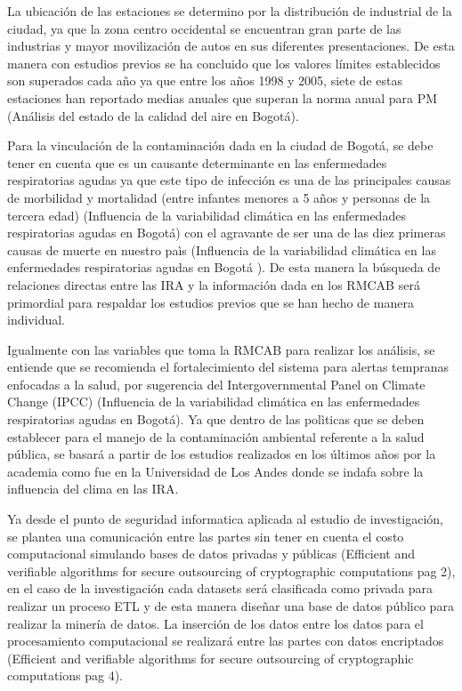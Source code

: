 \documentclass[a4paper, 11pt, oneside]{article}
\theoremstyle{definition}
\theoremstyle{remark}
\begin{document}
La ubicación de las estaciones se determino por la distribución de industrial de la ciudad, ya que la zona centro occidental se encuentran gran parte de las industrias y mayor movilización de autos en sus diferentes presentaciones. De esta manera con estudios previos se ha concluido que los valores límites establecidos son superados cada año ya que entre los años 1998 y 2005, siete de estas estaciones han reportado medias anuales que superan la norma anual para PM (Análisis del estado de la calidad del aire en Bogotá).

Para la vinculación de la contaminación dada en la ciudad de Bogotá, se debe tener en cuenta que es un causante determinante en las enfermedades respiratorias agudas ya que este tipo de infección es una de las principales causas de morbilidad y mortalidad (entre infantes menores a 5 años y personas de la tercera edad) (Influencia de la variabilidad climática en las enfermedades respiratorias agudas en Bogotá) con el agravante de ser una de las diez primeras causas de muerte en nuestro paìs (Influencia de la variabilidad climática en las enfermedades respiratorias agudas en Bogotá 
). De esta manera la búsqueda de relaciones directas entre las IRA y la información dada en los RMCAB será primordial para respaldar los estudios previos que se han hecho de manera individual. 


Igualmente con las variables que toma la RMCAB para realizar los análisis, se entiende que se recomienda el fortalecimiento del sistema para alertas tempranas enfocadas a la salud, por sugerencia del Intergovernmental Panel on Climate Change (IPCC) (Influencia de la variabilidad climática en las enfermedades respiratorias agudas en Bogotá). Ya que dentro de las polìticas que se deben establecer para el manejo de la contaminación ambiental referente a la salud pública, se basará a partir de los estudios realizados en los últimos años por la academia como fue en la Universidad de Los Andes donde se indafa sobre la influencia del clima en las IRA.

Ya desde el punto de seguridad informatica aplicada al estudio de investigación, se plantea una comunicación entre las partes sin tener en cuenta el costo computacional simulando bases de datos privadas y públicas (Efficient and verifiable algorithms for secure outsourcing of cryptographic computations pag 2), en el caso de la investigación cada datasets será clasificada como privada para realizar un proceso ETL y de esta manera diseñar una base de datos público para realizar la minería de datos. La inserción de los datos entre los datos para el procesamiento computacional se realizará entre las partes con datos encriptados (Efficient and verifiable algorithms for secure outsourcing of cryptographic computations pag 4).
\end{document}

